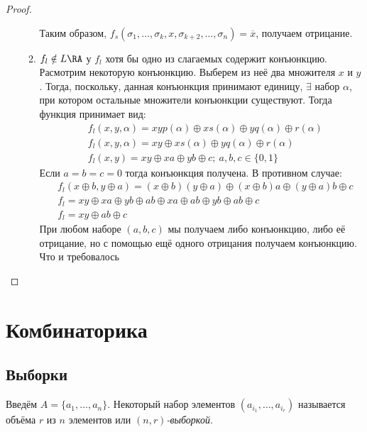 \documentclass[a4paper, 14pt]{article}
\begin{document}
\begin{proof}
\begin{enumerate}
\begin{enumerate}
                Таким образом, $f_s(\sigma_1, \dots, \sigma_k, x, \sigma_{k+2}, \dots, \sigma_n) = \overline{x}$, получаем отрицание.

                \item $f_l \notin L \RA$ у $f_l$ хотя бы одно из слагаемых содержит конъюнкцию.
                Расмотрим некоторую конъюнкцию. Выберем из неё два множителя $x$ и $y$. Тогда, поскольку,
                данная конъюнкция принимают единицу, $\exists$ набор $\alpha$, при котором остальные множители
                конъюнкции существуют. Тогда функция принимает вид:
                \begin{align*}
                    &f_l(x, y, \alpha) = xyp(\alpha) \oplus xs(\alpha) \oplus yq(\alpha) \oplus r(\alpha) \\
                    &f_l(x, y, \alpha) = xy \oplus xs(\alpha) \oplus yq(\alpha) \oplus r(\alpha) \\
                    &f_l(x, y) = xy \oplus xa \oplus yb \oplus c; \ a, b, c \in \{0, 1\}
                \end{align*}
                Если $a = b = c = 0$ тогда конъюнкция получена. В противном случае:
                \begin{align*}
                    &f_l(x \oplus b, y \oplus a) = (x \oplus b)(y \oplus a) \oplus (x \oplus b)a \oplus (y \oplus a)b \oplus c \\
                    &f_l = xy \oplus xa \oplus yb \oplus ab \oplus xa \oplus ab \oplus yb \oplus ab \oplus c \\
                    &f_l = xy \oplus ab \oplus c
                \end{align*}
                При любом наборе $(a, b, c)$ мы получаем либо конъюнкцию, либо её отрицание, но с помощью
                ещё одного отрицания получаем конъюнкцию. Что и требовалось
            \end{enumerate}

        \end{enumerate}
    \end{proof}

    \section{Комбинаторика}
    \subsection*{Выборки}
    \begin{definition}
        Введём $A = \{a_1, \dots, a_n\}$. Некоторый набор элементов
        $(a_{i_1}, \dots, a_{i_r})$ называется { объёма $r$ из $n$ элементов} или {\it$(n,r)$-выборкой}.
    \end{definition}
\end{document}
